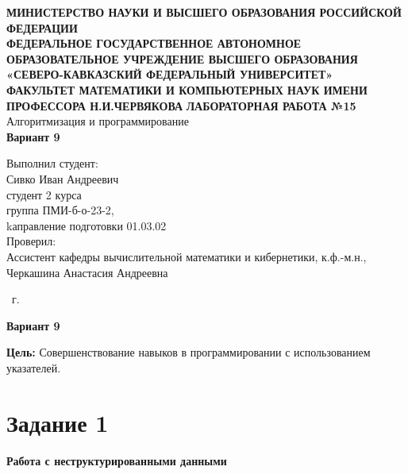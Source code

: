 \documentclass[14pt,a4paper]{article}
\begin{document}
\begin{titlepage}
\begin{center}
{\large\scshape\bfseries
МИНИСТЕРСТВО НАУКИ И ВЫСШЕГО ОБРАЗОВАНИЯ РОССИЙСКОЙ ФЕДЕРАЦИИ\\
ФЕДЕРАЛЬНОЕ ГОСУДАРСТВЕННОЕ АВТОНОМНОЕ ОБРАЗОВАТЕЛЬНОЕ УЧРЕЖДЕНИЕ ВЫСШЕГО ОБРАЗОВАНИЯ\\
«СЕВЕРО-КАВКАЗСКИЙ ФЕДЕРАЛЬНЫЙ УНИВЕРСИТЕТ»\\
ФАКУЛЬТЕТ МАТЕМАТИКИ И КОМПЬЮТЕРНЫХ НАУК ИМЕНИ ПРОФЕССОРА Н.И.ЧЕРВЯКОВА}
\vfill
{\Large\bfseries ЛАБОРАТОРНАЯ РАБОТА №15}\\[2mm]
{\large Алгоритмизация и программирование}\\[6mm]
{\Large\bfseries Вариант 9}\\[20mm]
\end{center}
\begin{flushright}
\large{
Выполнил студент:\\
Сивко Иван Андреевич\\
студент 2 курса\\
группа ПМИ-б-о-23-2,\\
kаправление подготовки 01.03.02\\[5mm]
Проверил:\\
Ассистент кафедры вычислительной математики и кибернетики, к.ф.-м.н.,\\
Черкашина Анастасия Андреевна}
\end{flushright}
\vfill
\begin{center}
\the\year\ г.
\end{center}
\end{titlepage}


\begin{center}
    \textbf{Вариант 9}
\end{center}
{\large {\bfseries Цель:} Совершенствование навыков в программировании с использованием\\ указателей.}

\section*{Задание 1}
\textbf{Работа с неструктурированными данными}
\renewcommand{\thesubsection}{\arabic{subsection}} %
\setcounter{subsection}{0} %
\end{document}
